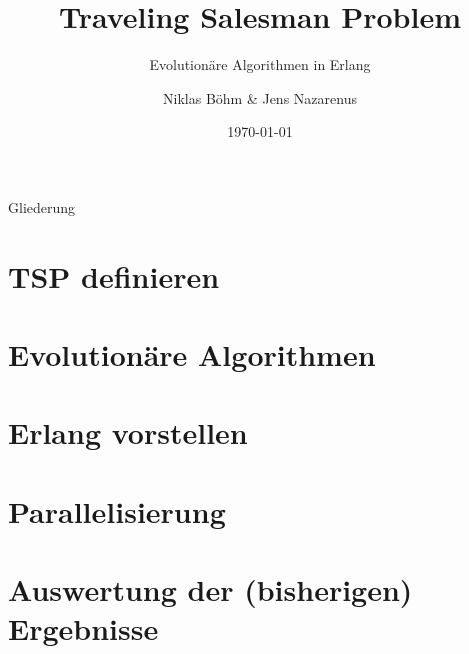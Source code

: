 \documentclass[compress]{beamer}
\title{Traveling Salesman Problem}
\subtitle{Evolutionäre Algorithmen in Erlang}
\author{Niklas Böhm \& Jens Nazarenus}
\institute{%
    \begin{tabular}{r l } %
      Fachbereich & {\Medium DCSM} \\
      Studiengang & {\Medium Angewandte Informatik}
    \end{tabular}%
  }
\date{\today}
\begin{document}
\maketitle

\begin{frame}{Gliederung}
  \tableofcontents[hideallsubsections]
\end{frame}

\section{TSP definieren}
\label{sec:tsp}

\section{Evolutionäre Algorithmen}
\label{sec:evolutionäre}

\section{Erlang vorstellen}
\label{sec:erlang}

\section{Parallelisierung}
\label{sec:parallelisierung}

\section{Auswertung der (bisherigen) Ergebnisse}
\label{sec:auswertung}
\end{document}
